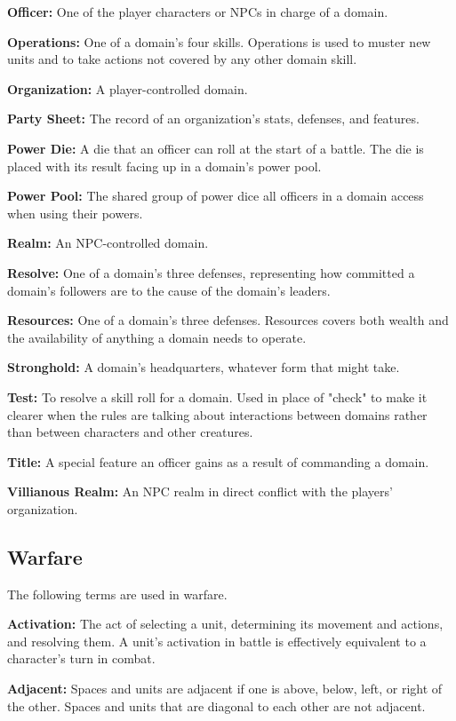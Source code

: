 \documentclass[10pt,a4paper,twoside,bg=print,twocolumn,openany,nodeprecatedcode]{dndbook}
\begin{document}
\textbf{Officer:} One of the player characters or NPCs in charge of a domain.

\textbf{Operations:} One of a domain's four skills. Operations is used to muster new units and to take actions not covered by any other domain skill.

\textbf{Organization:} A player-controlled domain.

\textbf{Party Sheet:} The record of an organization's stats, defenses, and features.

\textbf{Power Die:} A die that an officer can roll at the start of a battle. The die is placed with its result facing up in a domain's power pool.

\textbf{Power Pool:} The shared group of power dice all officers in a domain access when using their powers.

\textbf{Realm:} An NPC-controlled domain.

\textbf{Resolve:} One of a domain's three defenses, representing how committed a domain's followers are to the cause of the domain's leaders.

\textbf{Resources:} One of a domain's three defenses. Resources covers both wealth and the availability of anything a domain needs to operate.

\textbf{Stronghold:} A domain's headquarters, whatever form that might take.

\textbf{Test:} To resolve a skill roll for a domain. Used in place of "check" to make it clearer when the rules are talking about interactions between domains rather than between characters and other creatures.

\textbf{Title:} A special feature an officer gains as a result of commanding a domain.

\textbf{Villianous Realm:} An NPC realm in direct conflict with the players' organization.

\subsection{Warfare}
The following terms are used in warfare.

\textbf{Activation:} The act of selecting a unit, determining its movement and actions, and resolving them. A unit's activation in battle is effectively equivalent to a character's turn in combat.

\textbf{Adjacent:} Spaces and units are adjacent if one is above, below, left, or right of the other. Spaces and units that are diagonal to each other are not adjacent.
\end{document}
